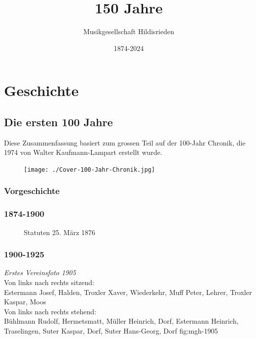 \documentclass[]{book}
\title{150 Jahre}
\author{Musikgesellschaft Hildisrieden}
\date{1874-2024}
\begin{document}
\frontmatter
\maketitle

\tableofcontents

\mainmatter

\part{Geschichte}
\chapter{Die ersten 100 Jahre}

Diese Zusammenfassung basiert zum grossen Teil auf der 100-Jahr Chronik, die 1974 von Walter Kaufmann-Lampart erstellt wurde.
\begin{figure}[ht]
    \texttt{[image: ./Cover-100-Jahr-Chronik.jpg]}
\end{figure}
\section{Vorgeschichte}



\section{1874-1900}

\begin{figure}[ht]
    \centering
    \hfil
    \caption{Statuten 25. März 1876}
    \label{fig:Statuten-1874}
\end{figure}


\clearpage

\section{1900-1925}


{\emph{Erstes Vereinsfoto 1905}\\
    Von links nach rechts sitzend:\\
    Estermann Josef, Halden, Troxler Xaver, Wiederkehr, Muff Peter, Lehrer,
    Troxler Kaspar, Moos\\
    Von links nach rechts stehend:\\
    Bühlmann Rudolf, Hermetsmatt, Müller Heinrich, Dorf, Estermann Heinrich,
    Traselingen, Suter Kaspar, Dorf, Suter Hans-Georg, Dorf} {fig:mgh-1905}
\end{document}
